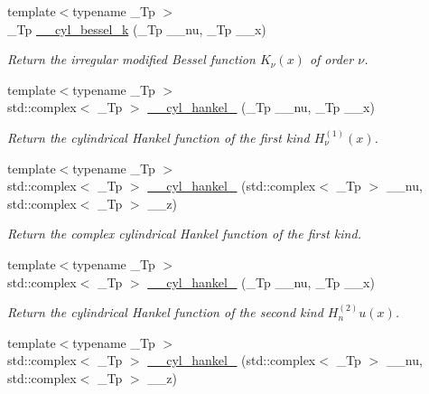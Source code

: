 \begin{DoxyCompactItemize}
{\footnotesize template$<$typename \+\_\+\+Tp $>$ }\\\+\_\+\+Tp \hyperlink{namespacestd_1_1____detail_ac9152f2369a18aa795fe24ccfa6dcf12}{\+\_\+\+\_\+cyl\+\_\+bessel\+\_\+k} (\+\_\+\+Tp \+\_\+\+\_\+nu, \+\_\+\+Tp \+\_\+\+\_\+x)
\begin{DoxyCompactList}\small\item\em Return the irregular modified Bessel function $ K_{\nu}(x) $ of order $ \nu $. \end{DoxyCompactList}\item 
{\footnotesize template$<$typename \+\_\+\+Tp $>$ }\\std\+::complex$<$ \+\_\+\+Tp $>$ \hyperlink{namespacestd_1_1____detail_aac3fc60c1210e8f2ae3cf05cdc7bad84}{\+\_\+\+\_\+cyl\+\_\+hankel\+\_} (\+\_\+\+Tp \+\_\+\+\_\+nu, \+\_\+\+Tp \+\_\+\+\_\+x)
\begin{DoxyCompactList}\small\item\em Return the cylindrical Hankel function of the first kind $ H^{(1)}_\nu(x) $. \end{DoxyCompactList}\item 
{\footnotesize template$<$typename \+\_\+\+Tp $>$ }\\std\+::complex$<$ \+\_\+\+Tp $>$ \hyperlink{namespacestd_1_1____detail_a9904b6007ef78ef777ac8345f6e47960}{\+\_\+\+\_\+cyl\+\_\+hankel\+\_} (std\+::complex$<$ \+\_\+\+Tp $>$ \+\_\+\+\_\+nu, std\+::complex$<$ \+\_\+\+Tp $>$ \+\_\+\+\_\+z)
\begin{DoxyCompactList}\small\item\em Return the complex cylindrical Hankel function of the first kind. \end{DoxyCompactList}\item 
{\footnotesize template$<$typename \+\_\+\+Tp $>$ }\\std\+::complex$<$ \+\_\+\+Tp $>$ \hyperlink{namespacestd_1_1____detail_a98615677d4042ef02fe2faf326f1a614}{\+\_\+\+\_\+cyl\+\_\+hankel\+\_} (\+\_\+\+Tp \+\_\+\+\_\+nu, \+\_\+\+Tp \+\_\+\+\_\+x)
\begin{DoxyCompactList}\small\item\em Return the cylindrical Hankel function of the second kind $ H^{(2)}_nu(x) $. \end{DoxyCompactList}\item 
{\footnotesize template$<$typename \+\_\+\+Tp $>$ }\\std\+::complex$<$ \+\_\+\+Tp $>$ \hyperlink{namespacestd_1_1____detail_a3a8bdfd85729c705dec2586dfa5b275b}{\+\_\+\+\_\+cyl\+\_\+hankel\+\_} (std\+::complex$<$ \+\_\+\+Tp $>$ \+\_\+\+\_\+nu, std\+::complex$<$ \+\_\+\+Tp $>$ \+\_\+\+\_\+z)

\end{DoxyCompactItemize}
